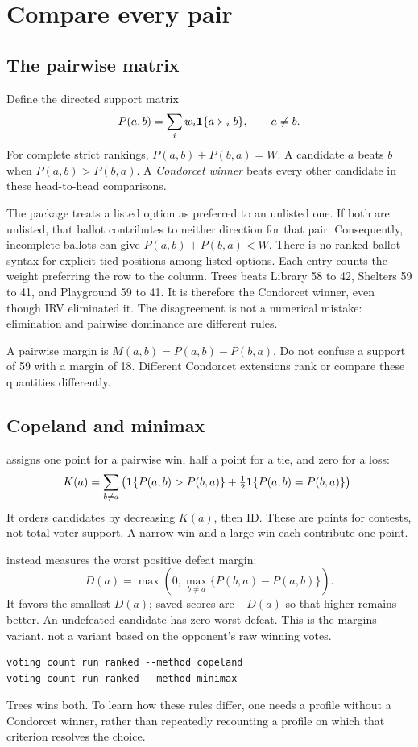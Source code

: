 \chapter{Compare every pair}
\label{chap:pairwise}
\section{The pairwise matrix}
Define the directed support matrix
\[
P(a,b)=\sum_iw_i\mathbf{1}\{a\succ_i b\},\qquad a\ne b.
\]
For complete strict rankings, $P(a,b)+P(b,a)=W$. A candidate $a$ beats $b$ when $P(a,b)>P(b,a)$. A \emph{Condorcet winner} beats every other candidate in these head-to-head comparisons.

The package treats a listed option as preferred to an unlisted one. If both are unlisted, that ballot contributes to neither direction for that pair. Consequently, incomplete ballots can give $P(a,b)+P(b,a)<W$. There is no ranked-ballot syntax for explicit tied positions among listed options.
Each entry counts the weight preferring the row to the column. Trees beats Library 58 to 42, Shelters 59 to 41, and Playground 59 to 41. It is therefore the Condorcet winner, even though IRV eliminated it. The disagreement is not a numerical mistake: elimination and pairwise dominance are different rules.

A pairwise margin is $M(a,b)=P(a,b)-P(b,a)$. Do not confuse a support of 59 with a margin of 18. Different Condorcet extensions rank or compare these quantities differently.

\section{Copeland and minimax}
 assigns one point for a pairwise win, half a point for a tie, and zero for a loss:
\[
K(a)=\sum_{b\ne a}\left(\mathbf{1}\{P(a,b)>P(b,a)\}
             +\tfrac12\mathbf{1}\{P(a,b)=P(b,a)\}\right).
\]
It orders candidates by decreasing $K(a)$, then ID. These are points for contests, not total voter support. A narrow win and a large win each contribute one point.

 instead measures the worst positive defeat margin:
\[
D(a)=\max\left(0,\max_{b\ne a}\{P(b,a)-P(a,b)\}\right).
\]
It favors the smallest $D(a)$; saved scores are $-D(a)$ so that higher remains better. An undefeated candidate has zero worst defeat. This is the margins variant, not a variant based on the opponent's raw winning votes.
\begin{lstlisting}[style=votingrun]
voting count run ranked --method copeland
voting count run ranked --method minimax
\end{lstlisting}
Trees wins both. To learn how these rules differ, one needs a profile without a Condorcet winner, rather than repeatedly recounting a profile on which that criterion resolves the choice.

